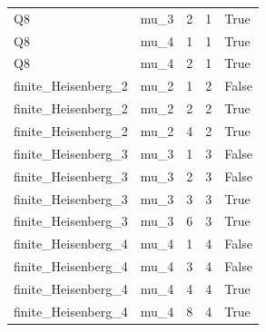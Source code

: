 \begin{table}[t]
\begin{tabular}{lllll}
Q8 & mu\_3 & 2 & 1 & True \\
Q8 & mu\_4 & 1 & 1 & True \\
Q8 & mu\_4 & 2 & 1 & True \\
finite\_Heisenberg\_2 & mu\_2 & 1 & 2 & False \\
finite\_Heisenberg\_2 & mu\_2 & 2 & 2 & True \\
finite\_Heisenberg\_2 & mu\_2 & 4 & 2 & True \\
finite\_Heisenberg\_3 & mu\_3 & 1 & 3 & False \\
finite\_Heisenberg\_3 & mu\_3 & 2 & 3 & False \\
finite\_Heisenberg\_3 & mu\_3 & 3 & 3 & True \\
finite\_Heisenberg\_3 & mu\_3 & 6 & 3 & True \\
finite\_Heisenberg\_4 & mu\_4 & 1 & 4 & False \\
finite\_Heisenberg\_4 & mu\_4 & 3 & 4 & False \\
finite\_Heisenberg\_4 & mu\_4 & 4 & 4 & True \\
finite\_Heisenberg\_4 & mu\_4 & 8 & 4 & True \\
\bottomrule
\end{tabular}
\end{table}
